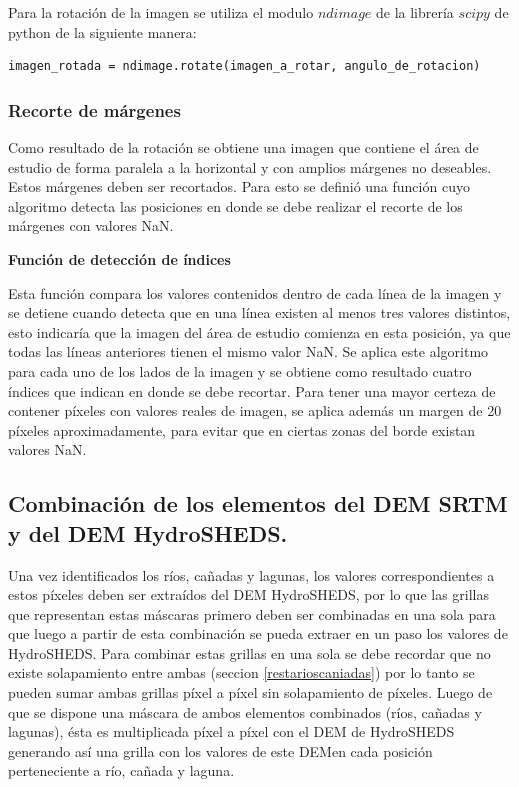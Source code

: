\documentclass[10pt,a4paper, twoside]{report}
\begin{document}
Para la rotación de la imagen se utiliza el modulo $ndimage$ de la librería $scipy$ de python de la siguiente manera:

\begin{lstlisting}
imagen_rotada = ndimage.rotate(imagen_a_rotar, angulo_de_rotacion)
\end{lstlisting}

\subsubsection{Recorte de márgenes}

Como resultado de la rotación se obtiene una imagen que contiene el área de estudio de forma paralela a la horizontal y con amplios márgenes no deseables. Estos márgenes deben ser recortados. Para esto se definió una función cuyo algoritmo detecta las posiciones en donde se debe realizar el recorte de los márgenes con valores NaN.

\textbf{Función de detección de índices}

Esta función compara los valores contenidos dentro de cada línea de la imagen y se detiene cuando detecta que en una línea existen al menos tres valores distintos, esto indicaría que la imagen del área de estudio comienza en esta posición, ya que todas las líneas anteriores tienen el mismo valor NaN. Se aplica este algoritmo para cada uno de los lados de la imagen y se obtiene como resultado cuatro índices que indican en donde se debe recortar. Para tener una mayor certeza de contener píxeles con valores reales de imagen, se aplica además un margen de 20 píxeles aproximadamente, para evitar que en ciertas zonas del borde existan valores NaN.



\subsection{Combinación de los elementos del DEM SRTM y del DEM HydroSHEDS.}

Una vez identificados los ríos, cañadas y lagunas, los valores correspondientes a estos píxeles deben ser extraídos del DEM HydroSHEDS, por lo que las grillas que representan estas máscaras primero deben ser combinadas en una sola para que luego a partir de esta combinación se pueda extraer en un paso los valores de HydroSHEDS. Para combinar estas grillas en una sola se debe recordar que no existe solapamiento entre ambas (seccion \ref{restarioscaniadas}) por lo tanto se pueden sumar ambas grillas píxel a píxel sin solapamiento de píxeles. Luego de que se dispone una máscara de ambos elementos combinados (ríos, cañadas y lagunas), ésta es multiplicada píxel a píxel con el DEM de HydroSHEDS generando así una grilla con los valores de este DEMen cada posición perteneciente a río, cañada y laguna.
\end{document}
